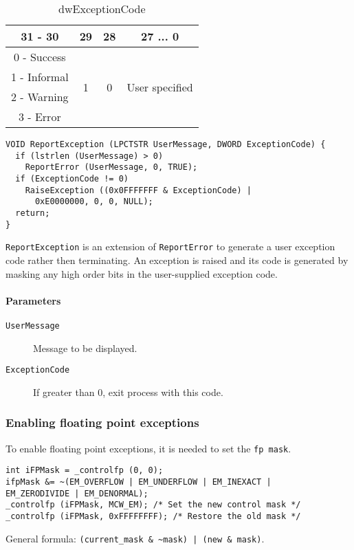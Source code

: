 \begin{table}
\centering
\begin{tabular}{|c|c|c|c|}
\hline 
31 - 30 & 29 & 28 & 27 ... 0 \\ 
\hline 
0 - Success & \multirow{4}{*}{1} & \multirow{4}{*}{0} & \multirow{4}{*}{User specified} \\ 
\cline{1-1} 
1 - Informal & & & \\ 
\cline{1-1} 
2 - Warning & & & \\ 
\cline{1-1} 
3 - Error & & & \\ 
\hline
\end{tabular} 
\caption{dwExceptionCode}
\label{tab:dwExceptionCode}
\end{table}

\begin{verbatim}
VOID ReportException (LPCTSTR UserMessage, DWORD ExceptionCode) {
  if (lstrlen (UserMessage) > 0)
    ReportError (UserMessage, 0, TRUE);
  if (ExceptionCode != 0)
    RaiseException ((0x0FFFFFFF & ExceptionCode) |
      0xE0000000, 0, 0, NULL);
  return;
}
\end{verbatim}
\texttt{ReportException} is an extension of \texttt{ReportError} to generate a user exception code rather then terminating. An exception is raised and its code is generated by masking any high order bits in the user-supplied exception code.

\paragraph{Parameters}
\begin{description}
\item [\texttt{UserMessage}] Message to be displayed.
\item [\texttt{ExceptionCode}] If greater than 0, exit process with this code.
\end{description}

\subsubsection{Enabling floating point exceptions}
To enable floating point exceptions, it is needed to set the \texttt{fp mask}.
\begin{verbatim}
int iFPMask = _controlfp (0, 0);
ifpMask &= ~(EM_OVERFLOW | EM_UNDERFLOW | EM_INEXACT |
EM_ZERODIVIDE | EM_DENORMAL);
_controlfp (iFPMask, MCW_EM); /* Set the new control mask */
_controlfp (iFPMask, 0xFFFFFFFF); /* Restore the old mask */
\end{verbatim}
General formula: \texttt{(current\_mask \& \~{}mask) | (new \& mask)}.

